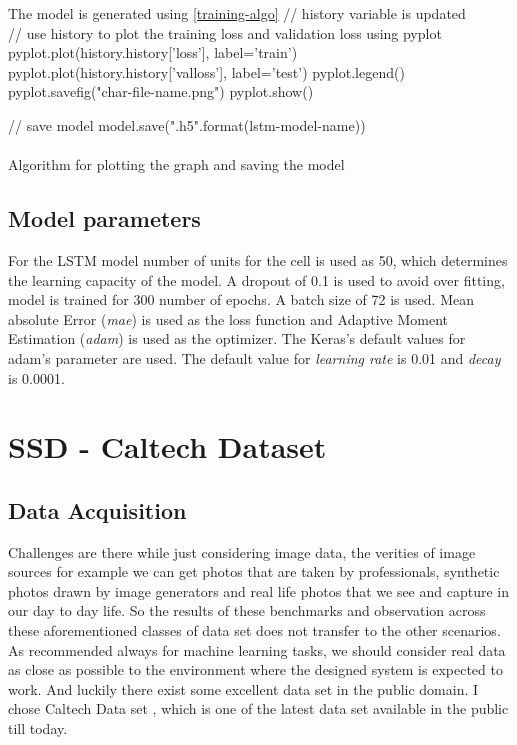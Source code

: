 \begin{algorithm}[H]
\SetAlgoLined
{}
 The model is generated using \ref{training-algo} \;
 // history variable is updated \\
 // use history to plot the training loss and validation loss using pyplot\;
 pyplot.plot(history.history['loss'], label='train')\;
 pyplot.plot(history.history['val\textunderscore loss'], label='test')\;
 pyplot.legend()\;
 pyplot.savefig("char-file-name.png")\;
 pyplot.show()\;

// save model\;
model.save("{}.h5".format(lstm-model-name)) \;
~\\
~\\
 \caption{Algorithm for plotting the graph and saving the model} 
\end{algorithm}

\subsection{Model parameters}
For the LSTM model number of units for the cell is used as 50, which determines the learning capacity of the model. A dropout of 0.1 is used to avoid over fitting, model is trained for  300 number of epochs. A batch size of 72 is used. Mean absolute Error (\textit{mae}) is used as the loss function and Adaptive Moment Estimation (\textit{adam}) is used as the optimizer. The Keras's default values for adam's parameter are used. The default value for \textit{learning rate} is 0.01 and \textit{decay} is 0.0001. 

\section{SSD - Caltech Dataset}

\subsection{Data Acquisition}
Challenges are there while just considering image data, the verities of image sources for example we can get photos that are taken by professionals, synthetic photos drawn by image generators and real life photos that we see and capture in our day to day life. So the results of these benchmarks and 
observation across these aforementioned classes of data set does not transfer to the other scenarios.
As recommended always for machine learning tasks, we should consider real data as close as possible to the environment where the designed system is expected to work. And luckily there exist some excellent data set in the public domain. I chose Caltech Data set \cite{dollar2009pedestrian}, which is one of the latest data set available in the public till today. 


